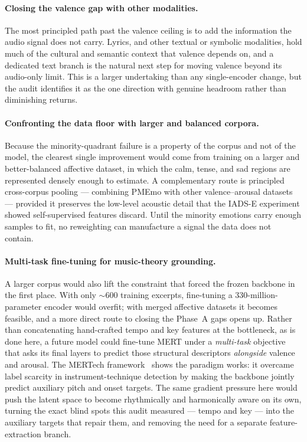 \documentclass[12pt]{report}
\begin{document}
\paragraph{Closing the valence gap with other modalities.}
The most principled path past the valence ceiling is to add the information the audio signal does not carry. Lyrics, and other textual or symbolic modalities, hold much of the cultural and semantic context that valence depends on, and a dedicated text branch is the natural next step for moving valence beyond its audio-only limit. This is a larger undertaking than any single-encoder change, but the audit identifies it as the one direction with genuine headroom rather than diminishing returns.

\paragraph{Confronting the data floor with larger and balanced corpora.}
Because the minority-quadrant failure is a property of the corpus and not of the model, the clearest single improvement would come from training on a larger and better-balanced affective dataset, in which the calm, tense, and sad regions are represented densely enough to estimate. A complementary route is principled cross-corpus pooling --- combining PMEmo with other valence--arousal datasets --- provided it preserves the low-level acoustic detail that the IADS-E experiment showed self-supervised features discard. Until the minority emotions carry enough samples to fit, no reweighting can manufacture a signal the data does not contain.

\paragraph{Multi-task fine-tuning for music-theory grounding.}
A larger corpus would also lift the constraint that forced the frozen backbone in the first place. With only $\sim\!600$ training excerpts, fine-tuning a $330$-million-parameter encoder would overfit; with merged affective datasets it becomes feasible, and a more direct route to closing the Phase~A gaps opens up. Rather than concatenating hand-crafted tempo and key features at the bottleneck, as is done here, a future model could fine-tune MERT under a \emph{multi-task} objective that asks its final layers to predict those structural descriptors \emph{alongside} valence and arousal. The MERTech framework~\cite{li_mertech_2024} shows the paradigm works: it overcame label scarcity in instrument-technique detection by making the backbone jointly predict auxiliary pitch and onset targets. The same gradient pressure here would push the latent space to become rhythmically and harmonically aware on its own, turning the exact blind spots this audit measured --- tempo and key --- into the auxiliary targets that repair them, and removing the need for a separate feature-extraction branch.
\end{document}
